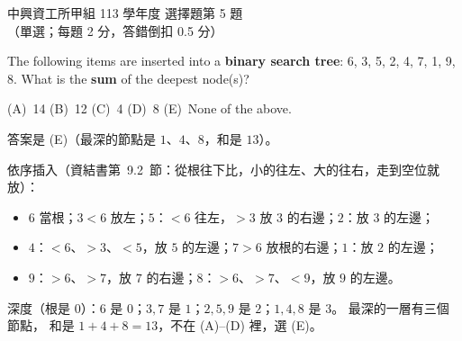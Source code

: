 \begin{pastexam}[label={px:nchu-113-dsa-05}]{中興資工所甲組 113 學年度 選擇題第 5 題}
（單選；每題 2 分，答錯倒扣 0.5 分）

The following items are inserted into a \textbf{binary search tree}: 6, 3, 5, 2, 4, 7, 1, 9, 8. What is the
\textbf{sum} of the deepest node(s)?

(A)~14 \qquad (B)~12 \qquad (C)~4 \qquad (D)~8 \qquad (E)~None of the above.
\end{pastexam}

\begin{pastsoln}
答案是 (E)（最深的節點是 $1$、$4$、$8$，和是 $13$）。

依序插入（資結書第~9.2~節：從根往下比，小的往左、大的往右，走到空位就放）：
\begin{itemize}
\item $6$ 當根；$3 < 6$ 放左；$5$：$< 6$ 往左，$> 3$ 放 $3$ 的右邊；$2$：放 $3$ 的左邊；
\item $4$：$< 6$、$> 3$、$< 5$，放 $5$ 的左邊；$7 > 6$ 放根的右邊；$1$：放 $2$ 的左邊；
\item $9$：$> 6$、$> 7$，放 $7$ 的右邊；$8$：$> 6$、$> 7$、$< 9$，放 $9$ 的左邊。
\end{itemize}

\begin{center}
\end{center}

深度（根是 $0$）：$6$ 是 $0$；$3, 7$ 是 $1$；$2, 5, 9$ 是 $2$；$1, 4, 8$ 是 $3$。 最深的一層有三個節點，
和是 $1 + 4 + 8 = 13$，不在 (A)--(D) 裡，選 (E)。
\end{pastsoln}
